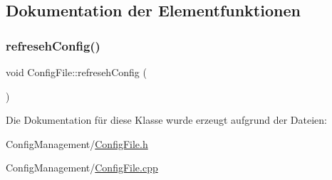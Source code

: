 \subsection{Dokumentation der Elementfunktionen}
\hypertarget{class_config_file_a48a2e1c781af3f0947c93d1d37e5b71a}{}\label{class_config_file_a48a2e1c781af3f0947c93d1d37e5b71a} 
\subsubsection{\texorpdfstring{refreseh\+Config()}{refresehConfig()}}
{\footnotesize\ttfamily void Config\+File\+::refreseh\+Config (\begin{DoxyParamCaption}{ }\end{DoxyParamCaption})}



Die Dokumentation für diese Klasse wurde erzeugt aufgrund der Dateien\+:\begin{DoxyCompactItemize}
\item 
Config\+Management/\hyperlink{_config_file_8h}{Config\+File.\+h}\item 
Config\+Management/\hyperlink{_config_file_8cpp}{Config\+File.\+cpp}\end{DoxyCompactItemize}
